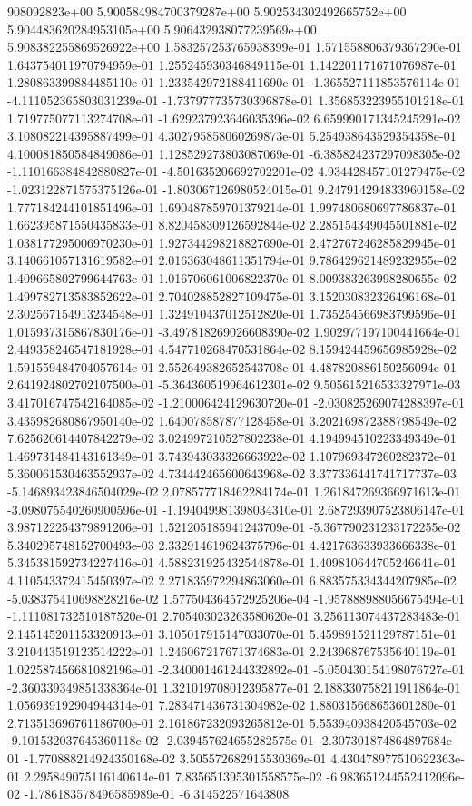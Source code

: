 908092823e+00	5.900584984700379287e+00	5.902534302492665752e+00	5.904483620284953105e+00	5.906432938077239569e+00	5.908382255869526922e+00
1.583257253765938399e-01	1.571558806379367290e-01	1.643754011970794959e-01	1.255245930346849115e-01	1.142201171671076987e-01	1.280863399884485110e-01	1.233542972188411690e-01	-1.365527111853576114e-01	-4.111052365803031239e-01	-1.737977735730396878e-01	1.356853223955101218e-01	1.719775077113274708e-01	-1.629237923646035396e-02	6.659990171345245291e-02	3.108082214395887499e-01	4.302795858060269873e-01	5.254938643529354358e-01	4.100081850584849086e-01	1.128529273803087069e-01	-6.385824237297098305e-02	-1.110166384842880827e-01	-4.501635206692702201e-02	4.934428457101279475e-02	-1.023122871575375126e-01	-1.803067126980524015e-01	9.247914294833960158e-02	1.777184244101851496e-01	1.690487859701379214e-01	1.997480680697786837e-01	1.662395871550435833e-01	8.820458309126592844e-02	2.285154349045501881e-02	1.038177295006970230e-01	1.927344298218827690e-01	2.472767246285829945e-01	3.140661057131619582e-01	2.016363048611351794e-01	9.786429621489232955e-02	1.409665802799644763e-01	1.016706061006822370e-01	8.009383263998280655e-02	1.499782713583852622e-01	2.704028852827109475e-01	3.152030832326496168e-01	2.302567154913234548e-01	1.324910437012512820e-01	1.735254566983799596e-01	1.015937315867830176e-01	-3.497818269026608390e-02	1.902977197100441664e-01	2.449358246547181928e-01	4.547710268470531864e-02	8.159424459656985928e-02	1.591559484704057614e-01	2.552649382652543708e-01	4.487820886150256094e-01	2.641924802702107500e-01	-5.364360519964612301e-02	9.505615216533327971e-03	3.417016747542164085e-02	-1.210006424129630720e-01	-2.030825269074288397e-01	3.435982680867950140e-02	1.640078587877128458e-01	3.202169872388798549e-02	7.625620614407842279e-02	3.024997210527802238e-01	4.194994510223349349e-01	1.469731484143161349e-01	3.743943033326663922e-02	1.107969347260282372e-01	5.360061530463552937e-02	4.734442465600643968e-02	3.377336441741717737e-03	-5.146893423846504029e-02	2.078577718462284174e-01	1.261847269366971613e-01	-3.098075540260900596e-01	-1.194049981398034310e-01	2.687293907523806147e-01	3.987122254379891206e-01	1.521205185941243709e-01	-5.367790231233172255e-02	5.340295748152700493e-03	2.332914619624375796e-01	4.421763633933666338e-01	5.345381592734227416e-01	4.588231925432544878e-01	1.409810644705246641e-01	4.110543372415450397e-02	2.271835972294863060e-01	6.883575334344207985e-02	-5.038375410698828216e-02	1.577504364572925206e-04	-1.957888988056675494e-01	-1.111081732510187520e-01	2.705403023263580620e-01	3.256113074437283483e-01	2.145145201153320913e-01	3.105017915147033070e-01	5.459891521129787151e-01	3.210443519123514222e-01	1.246067217671374683e-01	2.243968767535640119e-01	1.022587456681082196e-01	-2.340001461244332892e-01	-5.050430154198076727e-01	-2.360339349851338364e-01	1.321019708012395877e-01	2.188330758211911864e-01	1.056939192904944314e-01	7.283471436731304982e-02	1.880315668653601280e-01	2.713513696761186700e-01	2.161867232093265812e-01	5.553940938420545703e-02	-9.101532037645360118e-02	-2.039457624655282575e-01	-2.307301874864897684e-01	-1.770888214924350168e-02	3.505572682915530369e-01	4.430478977510622363e-01	2.295849075116140614e-01	7.835651395301558575e-02	-6.983651244552412096e-02	-1.786183578496585989e-01	-6.314522571643808
